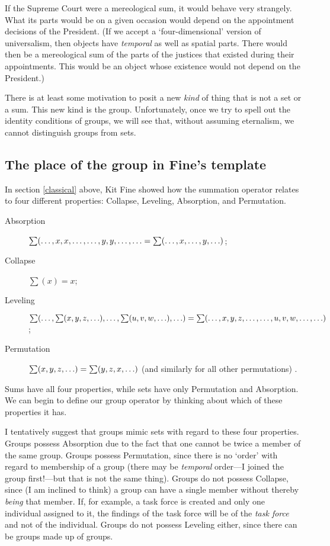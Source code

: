 \documentclass[11pt]{article}
\begin{document}
\begin{spacing}{1.5}
If the Supreme Court were a mereological sum, it would behave very
strangely.  What its parts would be on a given occasion would depend
on the appointment decisions of the President.  (If we accept a
`four-dimensional' version of universalism, then objects have {\em
  temporal} as well as spatial parts.  There would then be a
mereological sum of the parts of the justices that existed during
their appointments.  This would be an object whose existence would not
depend on the President.)

There is at least some motivation to posit a new {\em kind} of thing
that is not a set or a sum.  This new kind is the group.
Unfortunately, once we try to spell out the identity conditions of
groups, we will see that, without assuming eternalism, we cannot
distinguish groups from sets.

\subsection{The place of the group in Fine's template}
\label{group-temp}
In section \ref{classical} above, Kit Fine showed how the summation
operator relates to four different properties: Collapse, Leveling,
Absorption, and Permutation.

\begin{description}
  \item[Absorption] $\sum (\mathellipsis, x, x, \mathellipsis,
    \mathellipsis, y, y, \mathellipsis, \mathellipsis = \sum (
    \mathellipsis, x, \mathellipsis, y, \mathellipsis )$;
\item[Collapse] $\sum (x) = x$;
\item[Leveling] $\sum (\mathellipsis, \sum (x, y, z, \mathellipsis ),
  \mathellipsis, \sum (u, v, w, \mathellipsis ), \mathellipsis ) \\ =
  \sum (\mathellipsis, x, y, z, \mathellipsis, \mathellipsis, u, v, w,
  \mathellipsis, \mathellipsis )$;
\item[Permutation] $\sum (x, y, z, \mathellipsis ) = \sum (y, z, x,
  \mathellipsis )$ (and similarly for all other permutations)
  \citep[573]{fine2010}.
\end{description}

Sums have all four properties, while sets have only Permutation and
Absorption.  We can begin to define our group operator by thinking
about which of these properties it has.

I tentatively suggest that groups mimic sets with regard to these
four properties.  Groups possess Absorption due to the fact that one
cannot be twice a member of the same group.  Groups possess
Permutation, since there is no `order' with regard to membership of a
group (there may be {\em temporal} order---I joined the group
first!---but that is not the same thing).  Groups do not possess
Collapse, since (I am inclined to think) a group can have a single
member without thereby {\em being} that member.  If, for example, a
task force is created and only one individual assigned to it, the
findings of the task force will be of the {\em task force} and not of
the individual.  Groups do not possess Leveling either, since there
can be groups made up of groups.


\end{spacing}
\end{document}
